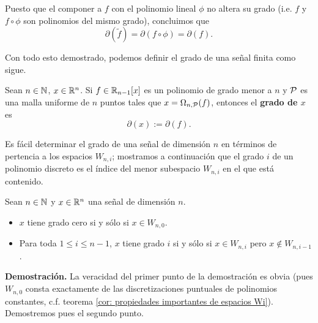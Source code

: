 Puesto que el componer a $f$ con el polinomio lineal
$\phi$ no altera su grado (i.e. $f$ y $f \circ \phi$
son polinomios del mismo grado), concluimos que
\[
\partial(\tilde{f})= \partial(f \circ \phi)=
\partial(f).
\]
\QEDB
\vspace{0.2cm}

Con todo esto demostrado, podemos definir
el grado de una señal finita como sigue.

\begin{defi}
\label{def: del grado de una senial finita}
Sean $n \in \mathbb{N}$, $x \in \mathbb{R}^{n}$.
Si $f \in \mathbb{R}_{n-1}[x]$
es un polinomio de grado menor a $n$
y $\mathcal{P}$ es una malla uniforme
de $n$ puntos tales que
$x= \Omega_{n, \mathcal{P}}(f)$, entonces
el \textbf{grado de $x$} es 
\[
\partial(x):= \partial(f).
\]
\end{defi}

Es fácil determinar el grado de una señal 
de dimensión $n$
en términos de pertencia a los espacios $W_{n,i}$;
mostramos a continuación que
el grado $i$ de un polinomio discreto es el índice
del menor subespacio $W_{n,i}$ en el que está contenido.

\begin{prop}
\label{prop: grado de x}
Sean $n \in \mathbb{N}$ y $x \in \mathbb{R}^{n}$ una señal de dimensión $n$.
\begin{itemize}
\item $x$ tiene grado cero si y sólo si $x \in W_{n,0}$.
\item Para toda $1 \leq i \leq n-1$,
$x$ tiene
grado $i$ si y sólo si 
$x \in W_{n,i}$ pero $x \not\in W_{n,i-1}$.
\end{itemize}
\end{prop}
\noindent
\textbf{Demostración.}
La veracidad del primer punto de la demostración
es obvia (pues $W_{n,0}$ consta exactamente de las discretizaciones
puntuales de polinomios constantes, c.f. 
teorema \ref{cor: propiedades importantes de espacios Wi}).
Demostremos pues el segundo punto.

